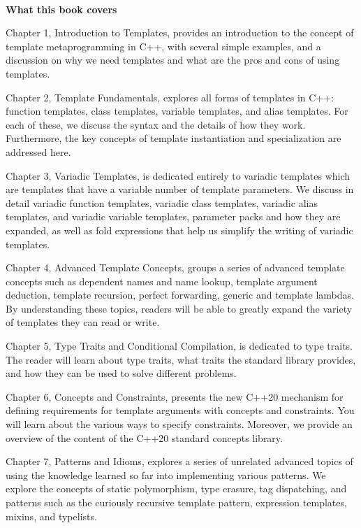 \hspace*{\fill} \\ %
\noindent
\textbf{What this book covers}

Chapter 1, Introduction to Templates, provides an introduction to the concept of template metaprogramming in C++, with several simple examples, and a discussion on why we need templates and what are the pros and cons of using templates.

Chapter 2, Template Fundamentals, explores all forms of templates in C++: function templates, class templates, variable templates, and alias templates. For each of these, we discuss the syntax and the details of how they work. Furthermore, the key concepts of template instantiation and specialization are addressed here.

Chapter 3, Variadic Templates, is dedicated entirely to variadic templates which are templates that have a variable number of template parameters. We discuss in detail variadic function templates, variadic class templates, variadic alias templates, and variadic variable templates, parameter packs and how they are expanded, as well as fold expressions that help us simplify the writing of variadic templates.

Chapter 4, Advanced Template Concepts, groups a series of advanced template concepts such as dependent names and name lookup, template argument deduction, template recursion, perfect forwarding, generic and template lambdas. By understanding these topics, readers will be able to greatly expand the variety of templates they can read or write.

Chapter 5, Type Traits and Conditional Compilation, is dedicated to type traits. The reader will learn about type traits, what traits the standard library provides, and how they can be used to solve different problems.

Chapter 6, Concepts and Constraints, presents the new C++20 mechanism for defining requirements for template arguments with concepts and constraints. You will learn about the various ways to specify constraints. Moreover, we provide an overview of the content of the C++20 standard concepts library.

Chapter 7, Patterns and Idioms, explores a series of unrelated advanced topics of using the knowledge learned so far into implementing various patterns. We explore the concepts of static polymorphism, type erasure, tag dispatching, and patterns such as the curiously recursive template pattern, expression templates, mixins, and typelists.

